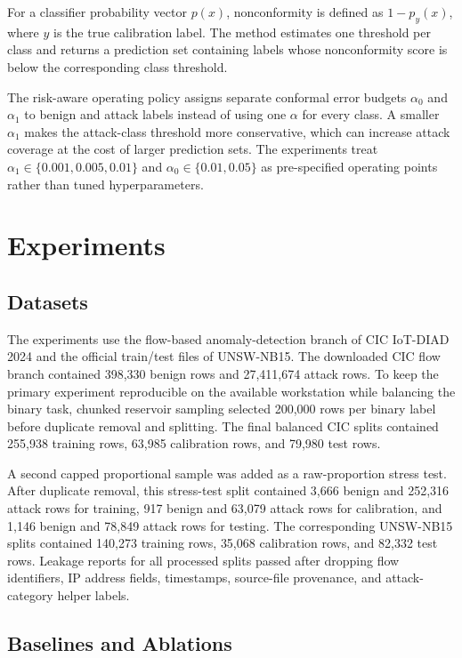 \documentclass[11pt]{article}
\begin{document}
For a classifier probability vector \(p(x)\), nonconformity is defined as \(1 - p_y(x)\), where \(y\) is the true calibration label. The method estimates one threshold per class and returns a prediction set containing labels whose nonconformity score is below the corresponding class threshold.

The risk-aware operating policy assigns separate conformal error budgets \(\alpha_0\) and \(\alpha_1\) to benign and attack labels instead of using one \(\alpha\) for every class. A smaller \(\alpha_1\) makes the attack-class threshold more conservative, which can increase attack coverage at the cost of larger prediction sets. The experiments treat \(\alpha_1 \in \{0.001, 0.005, 0.01\}\) and \(\alpha_0 \in \{0.01, 0.05\}\) as pre-specified operating points rather than tuned hyperparameters.

\section{Experiments}

\subsection{Datasets}

The experiments use the flow-based anomaly-detection branch of CIC IoT-DIAD 2024 and the official train/test files of UNSW-NB15. The downloaded CIC flow branch contained 398,330 benign rows and 27,411,674 attack rows. To keep the primary experiment reproducible on the available workstation while balancing the binary task, chunked reservoir sampling selected 200,000 rows per binary label before duplicate removal and splitting. The final balanced CIC splits contained 255,938 training rows, 63,985 calibration rows, and 79,980 test rows.

A second capped proportional sample was added as a raw-proportion stress test. After duplicate removal, this stress-test split contained 3,666 benign and 252,316 attack rows for training, 917 benign and 63,079 attack rows for calibration, and 1,146 benign and 78,849 attack rows for testing. The corresponding UNSW-NB15 splits contained 140,273 training rows, 35,068 calibration rows, and 82,332 test rows. Leakage reports for all processed splits passed after dropping flow identifiers, IP address fields, timestamps, source-file provenance, and attack-category helper labels.

\subsection{Baselines and Ablations}
\end{document}
